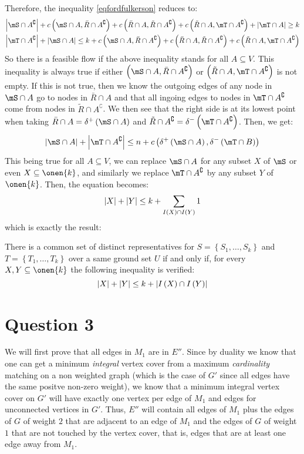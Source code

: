 \documentclass[math]{cours}
\def\bR{\bar{R}}
\def\tR{\tilde{R}}
\def\Ac{A^{\complement}}
\begin{document}
Therefore, the inequality \ref{eqfordfulkerson} reduces to:
\begin{align*}
	\abs{\mS \cap \Ac} + c\left(\mS\cap A, \bR\cap \Ac \right) + c\left(\bR\cap A, \tR\cap \Ac \right) + c\left( \tR\cap A, \mT\cap \Ac \right) + \abs{\mT \cap A} \geq k\\
	\abs{\mT \cap \Ac} + \abs{\mS\cap A} \leq k + c\left(\mS \cap A, \bR\cap\Ac \right) + c\left(\bR \cap A, \tR\cap \Ac \right) + c\left(\tR\cap A, \mT\cap\Ac \right)
\end{align*}
So there is a feasible flow if the above inequality stands for all $A \subseteq V$.
This inequality is always true if either $\left(\mS\cap A, \bR\cap \Ac \right)$ or $\left(\tR\cap A, \mT\cap \Ac \right)$ is not empty.
If this is not true, then we know the outgoing edges of any node in $\mS \cap A$ go to nodes in $\bR \cap A$ and that all ingoing edges to nodes in $\mT\cap \Ac$ come from nodes in $\tR\cap\Ac$.
We then see that the right side is at its lowest point when taking $\bR \cap A = \delta^{+}\left(\mS \cap A\right)$ and $\tR\cap \Ac = \delta^{-}\left( \mT\cap \Ac \right)$.
Then, we get:
\begin{equation*}
	\abs{\mS \cap A} + \abs{\mT\cap \Ac} \leq n + c\left(\delta^{+}\left(\mS\cap A \right), \delta^{-}\left( \mT\cap B \right) \right)
\end{equation*}
This being true for all $A \subseteq V$, we can replace $\mS\cap A$ for any subset $X$ of $\mS$ or even $X \subseteq \onen{k}$, and similarly we replace $\mT\cap \Ac$ by any subset $Y$ of $\onen{k}$.
Then, the equation becomes:
\begin{equation*}
	\left|X\right| + \left|Y\right| \leq k + \sum_{I\left(X\right) \cap I\left(Y\right)} 1
\end{equation*}
which is exactly the result:
\begin{thm}
There is a common set of distinct representatives for $S = \left\{S_{1}, \ldots, S_{k} \right\}$ and $T = \left\{T_{1}, \ldots, T_{k} \right\}$ over a same ground set $U$ if and only if, for every $X, Y \subseteq \onen{k}$ the following inequality is verified:
\begin{equation*}
	\left|X\right| + \left|Y\right| \leq k + \left|I\left(X\right) \cap I\left(Y\right)\right|
\end{equation*}
\end{thm}

\section{Question 3}
We will first prove that all edges in $M_{1}$ are in $E''$.
Since by duality we know that one can get a minimum \emph{integral} vertex cover from a maximum \emph{cardinality} matching on a non weighted graph (which is the case of $G'$ since all edges have the same positve non-zero weight), we know that a minimum integral vertex cover on $G'$ will have exactly one vertex per edge of $M_{1}$ and edges for unconnected vertices in $G'$.
Thus, $E''$ will contain all edges of $M_{1}$ plus the edges of $G$ of weight $2$ that are adjacent to an edge of $M_{1}$ and the edges of $G$ of weight $1$ that are not touched by the vertex cover, that is, edges that are at least one edge away from $M_{1}$.
\end{document}
